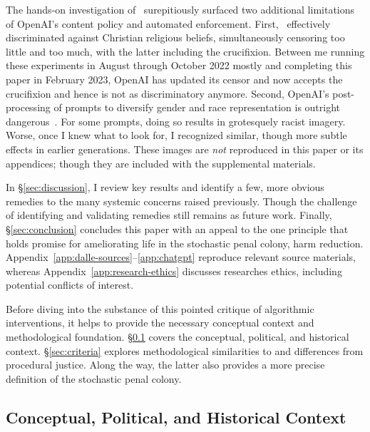 The hands-on investigation of \DALLE\ surepitiously surfaced two additional
limitations of OpenAI's content policy and automated enforcement. First, \DALLE\
effectively discriminated against Christian religious beliefs, simultaneously
censoring too little and too much, with the latter including the crucifixion.
Between me running these experiments in August through October 2022 mostly and
completing this paper in February 2023, OpenAI has updated its censor and now
accepts the crucifixion and hence is not as discriminatory anymore. Second,
OpenAI's post-processing of prompts to diversify gender and race representation
is outright dangerous~\cite{OpenAI2022e,Sparkes2022}. For some prompts, doing so
results in grotesquely racist imagery. Worse, once I knew what to look for, I
recognized similar, though more subtle effects in earlier generations. These
images are \emph{not} reproduced in this paper or its appendices; though they
are included with the supplemental materials.

In \S\ref{sec:discussion}, I review key results and identify a few, more obvious
remedies to the many systemic concerns raised previously. Though the challenge
of identifying and validating remedies still remains as future work. Finally,
\S\ref{sec:conclusion} concludes this paper with an appeal to the one principle
that holds promise for ameliorating life in the stochastic penal colony, harm
reduction. Appendix~\ref{app:dalle-sources}--\ref{app:chatgpt} reproduce
relevant source materials, whereas Appendix~\ref{app:research-ethics} discusses
researches ethics, including potential conflicts of interest.

Before diving into the substance of this pointed critique of algorithmic
interventions, it helps to provide the necessary conceptual context and
methodological foundation. \S\ref{sec:context} covers the conceptual, political,
and historical context. \S\ref{sec:criteria} explores methodological
similarities to and differences from procedural justice. Along the way, the
latter also provides a more precise definition of the stochastic penal colony.


\subsection{Conceptual, Political, and Historical Context}
\label{sec:context}

